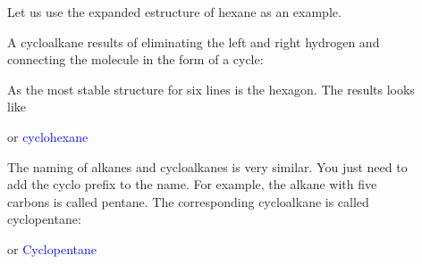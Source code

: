 \documentclass[main.tex]{subfiles}
\begin{document}
\begin{description}
\item[] Let us use the expanded estructure of hexane as an example. 
\begin{center}\end{center}
A cycloalkane results of eliminating the left and right hydrogen and connecting the molecule in the form of a cycle:
\begin{center}\end{center}

As the most stable structure for six lines is the hexagon. The results looks like

\begin{center}\hspace{1cm} or \hspace{1cm}  \hspace{0.5cm}\textcolor{blue}{cyclohexane}\end{center}

\item[] The naming of alkanes and cycloalkanes is very similar. You just need to add the cyclo prefix to the name. For example, the alkane with five carbons is called pentane. The corresponding cycloalkane is called cyclopentane:
\begin{center}\hspace{1cm} or \hspace{1cm}  \hspace{0.5cm}\textcolor{blue}{Cyclopentane}\end{center}


\end{description}
\end{document}
